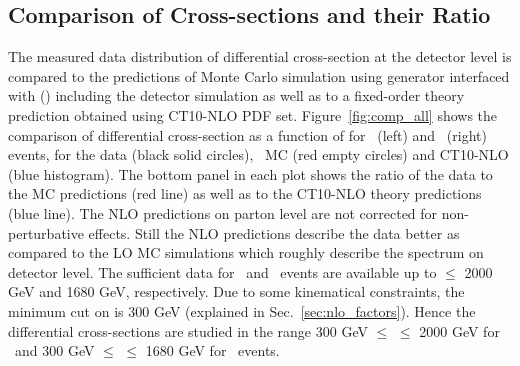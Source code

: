\subsection{Comparison of Cross-sections and their Ratio}
The measured data distribution of differential cross-section at the detector level is compared to the predictions of Monte Carlo simulation using \MadGraphF generator interfaced with \PYTHIAS (\MGP) including the detector simulation as well as to a fixed-order theory prediction obtained using CT10-NLO PDF set. Figure~\ref{fig:comp_all} shows the comparison of differential cross-section as a function of \httwo for \njt~(left) and \njth~(right) events, for the data (black solid circles), \MGP~MC (red empty circles) and CT10-NLO (blue histogram). The bottom panel in each plot shows the ratio of the data to the MC predictions (red line) as well as to the CT10-NLO theory predictions (blue line). The NLO predictions on parton level are not corrected for non-perturbative effects. Still the NLO predictions describe the data better as compared to the LO MC simulations which roughly describe the spectrum on detector level. The sufficient data for \njt~and \njth~events are available up to \httwo $\leq$ 2000 GeV and 1680 GeV, respectively. Due to some kinematical constraints, the minimum cut on \httwo is 300 GeV (explained in Sec.~\ref{sec:nlo_factors}). Hence the differential cross-sections are studied in the range 300 GeV $\leq$ \httwo $\leq$ 2000 GeV for \njt~and 300 GeV $\leq$ \httwo $\leq$ 1680 GeV for \njth~events.

